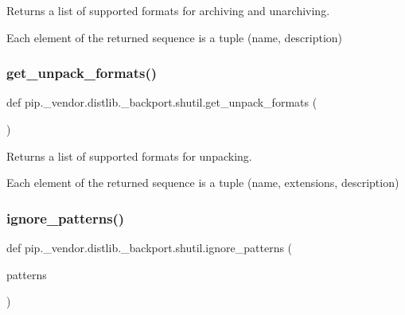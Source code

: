 \begin{DoxyVerb}Returns a list of supported formats for archiving and unarchiving.

Each element of the returned sequence is a tuple (name, description)
\end{DoxyVerb}
 \mbox{\label{namespacepip_1_1__vendor_1_1distlib_1_1__backport_1_1shutil_a453818fd244425a96ba15ed03fe7f9a0}} 
\subsubsection{\texorpdfstring{get\+\_\+unpack\+\_\+formats()}{get\_unpack\_formats()}}
{\footnotesize\ttfamily def pip.\+\_\+vendor.\+distlib.\+\_\+backport.\+shutil.\+get\+\_\+unpack\+\_\+formats (\begin{DoxyParamCaption}{ }\end{DoxyParamCaption})}

\begin{DoxyVerb}Returns a list of supported formats for unpacking.

Each element of the returned sequence is a tuple
(name, extensions, description)
\end{DoxyVerb}
 \mbox{\label{namespacepip_1_1__vendor_1_1distlib_1_1__backport_1_1shutil_af05e2daf581728865ed0aee7f6b86737}} 
\subsubsection{\texorpdfstring{ignore\+\_\+patterns()}{ignore\_patterns()}}
{\footnotesize\ttfamily def pip.\+\_\+vendor.\+distlib.\+\_\+backport.\+shutil.\+ignore\+\_\+patterns (\begin{DoxyParamCaption}\item[{}]{patterns }\end{DoxyParamCaption})}

